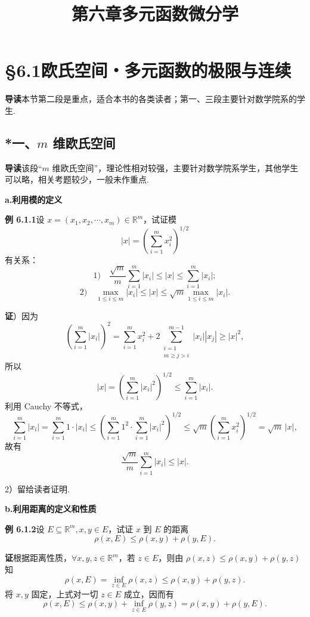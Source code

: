 \documentclass[UTF8, 12pt, fontset=fandol, oneside]{ctexart}
\title{第六章\quad 多元函数微分学}
\author{}
\date{}
\begin{document}
\maketitle

\section*{§6.1\quad 欧氏空间・多元函数的极限与连续}

\noindent\textbf{导读}\quad 本节第二段是重点，适合本书的各类读者；第一、三段主要针对数学院系的学生.

\subsection*{*一、$m$ 维欧氏空间}

\noindent\textbf{导读}\quad 该段“$m$ 维欧氏空间”，理论性相对较强，主要针对数学院系学生，其他学生可以略，相关考题较少，一般未作重点.

\noindent\textbf{a.\quad 利用模的定义}

\noindent\textbf{例 6.1.1}\quad 设 $x=(x_1,x_2,\cdots,x_m)\in\mathbb{R}^m$，试证模
\[
  |x|=\left(\sum_{i=1}^m x_i^2\right)^{1/2}
\]
有关系：
\[
  1)\quad \frac{\sqrt m}{m}\sum_{i=1}^m |x_i|\le |x|\le \sum_{i=1}^m |x_i|;
\]
\[
  2)\quad \max_{1\le i\le m}|x_i|\le |x|\le
  \sqrt m\max_{1\le i\le m}|x_i|.
\]

\noindent\textbf{证}）因为
\[
  \left(\sum_{i=1}^m |x_i|\right)^2
  =\sum_{i=1}^m x_i^2+
  2\sum_{\substack{i=1\\ m\ge j>i}}^{m-1}|x_i||x_j|
  \ge |x|^2,
\]
所以
\[
  |x|=\left(\sum_{i=1}^m |x_i|^2\right)^{1/2}
  \le \sum_{i=1}^m |x_i|.
\]
利用 Cauchy 不等式，
\[
  \sum_{i=1}^m |x_i|
  =\sum_{i=1}^m 1\cdot |x_i|
  \le \left(\sum_{i=1}^m 1^2\cdot\sum_{i=1}^m |x_i|^2\right)^{1/2}
  \le \sqrt m\left(\sum_{i=1}^m x_i^2\right)^{1/2}
  =\sqrt m\,|x|,
\]
故有
\[
  \frac{\sqrt m}{m}\sum_{i=1}^m |x_i|\le |x|.
\]

2）留给读者证明.

\noindent\textbf{b.\quad 利用距离的定义和性质}

\noindent\textbf{例 6.1.2}\quad 设 $E\subseteq\mathbb{R}^m,x,y\in E$，试证 $x$ 到 $E$ 的距离
\[
  \rho(x,E)\le \rho(x,y)+\rho(y,E).
\]

\noindent\textbf{证}\quad 根据距离性质，$\forall x,y,z\in\mathbb{R}^m$，若 $z\in E$，则由 $\rho(x,z)\le \rho(x,y)+\rho(y,z)$ 知
\[
  \rho(x,E)=\inf_{z\in E}\rho(x,z)\le \rho(x,y)+\rho(y,z).
\]
将 $x,y$ 固定，上式对一切 $z\in E$ 成立，因而有
\[
  \rho(x,E)\le \rho(x,y)+\inf_{z\in E}\rho(y,z)
  =\rho(x,y)+\rho(y,E).
\]
\end{document}
